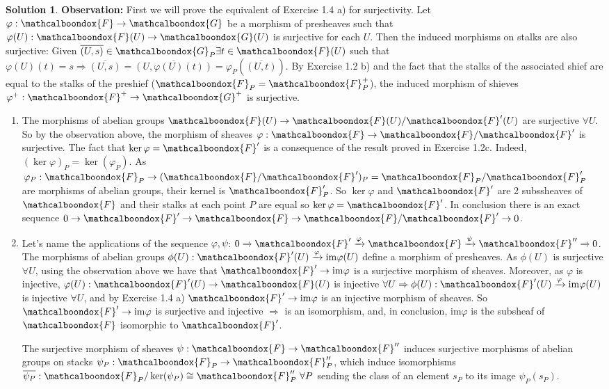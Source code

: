 \documentclass[12pt]{article}
\newcommand{\imp}{\ensuremath{\Rightarrow}}
\newcommand{\ima}{\ensuremath{\mathrm{im}}}
\theoremstyle{definition}
\newtheorem*{sol}{Solution}
\newcommand{\sF}{\ensuremath{\mathcalboondox{F}}}
\newcommand{\sG}{\ensuremath{\mathcalboondox{G}}}
\begin{document}
\begin{sol}
	\textbf{Observation:} First we will prove the equivalent of Exercise 1.4 a) for surjectivity. Let $\varphi: \sF \to \sG$ be a morphism of presheaves such that $\varphi(U): \sF(U) \to \sG(U)$ is surjective for each $U$. Then the induced morphisms on stalks are also surjective: Given $\overline{(U,s)} \in \sG_P \exists t \in \sF(U)$ such that $\varphi(U)(t) = s \imp \overline{(U,s)} = \overline{(U, \varphi(U)(t))} = \varphi_P(\overline{(U,t)})$. By Exercise 1.2 b) and the fact that the stalks of the associated shief are equal to the stalks of the preshief ($\sF_P = \sF^{+}_P$), the induced morphism of shieves $\varphi^{+}: \sF^{+} \to \sG^{+}$ is surjective.
	\begin{enumerate}[label=\alph*)]
		\item The morphisms of abelian groups $\sF(U) \to \sF(U)/\sF'(U)$ are surjective $\forall U$. So by the observation above, the morphism of sheaves $\varphi: \sF \to \sF/\sF'$ is surjective. The fact that $\ker \varphi = \sF'$ is a consequence of the result proved in Exercise 1.2c. Indeed, $(\ker \varphi)_P = \ker (\varphi_P)$. As $\varphi_P: \sF_P \to (\sF/\sF')_P = \sF_P/\sF'_P$ are morphisms of abelian groups, their kernel is $\sF'_P$. So $\ker \varphi$ and $\sF'$ are 2 subssheaves of $\sF$ and their stalks at each point $P$ are equal so $\ker \varphi = \sF'$. In conclusion there is an exact sequence $0 \to \sF' \to \sF \to \sF / \sF' \to 0$.

		\item Let's name the applications of the sequence $\varphi, \psi$: $0 \xrightarrow[]{} \sF' \xrightarrow[]{\varphi} \sF \xrightarrow[]{\psi} \sF'' \xrightarrow[]{} 0$. The morphisms of abelian groups $\phi(U): \sF'(U) \xrightarrow[]{\varphi} \ima\varphi(U)$ define a morphism of presheaves. As $\phi(U)$ is surjective $\forall U$, using the observation above we have that $\sF' \to \ima \varphi$ is a surjective morphism of sheaves. Moreover, as $\varphi$ is injective, $\varphi(U): \sF'(U) \to \sF(U)$ is injective $\forall U \imp \phi(U): \sF'(U) \xrightarrow[]{\varphi} \ima \varphi(U)$ is injective $\forall U$, and by Exercise 1.4 a) $\sF' \to \ima \varphi$ is an injective morphism of sheaves. So $\sF' \to \ima \varphi$ is surjective and injective $\imp$ is an isomorphism, and, in conclusion, $\ima \varphi$ is the subsheaf of $\sF$ isomorphic to $\sF'$.

		The surjective morphism of sheaves $\psi: \sF \to \sF''$ induces surjective morphisms of abelian groups on stacks $\psi_P: \sF_P \to \sF''_P$, which induce isomorphisms $\overline{\psi_P}: \sF_P/\ker(\psi_P) \cong \sF''_P \, \, \forall P$ sending the class of an element $s_P$ to its image $\psi_P(s_P)$. 


\end{enumerate}
\end{sol}
\end{document}

